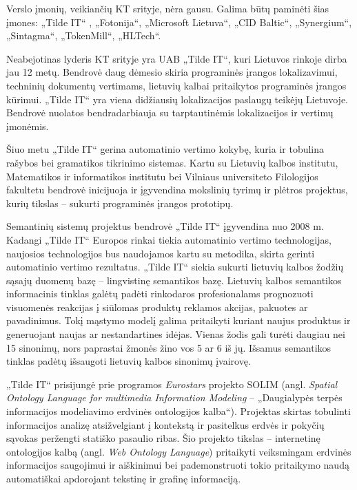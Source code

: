 \documentclass[]{../metanetpaper}
\begin{document}
\begin{multicols}{2}
Verslo įmonių, veikiančių KT srityje, nėra gausu. Galima būtų paminėti šias įmones: „Tilde IT“ , „Fotonija“, „Microsoft Lietuva“,  „CID Baltic“,  „Synergium“, „Sintagma“, „TokenMill“, „HLTech“.

    Neabejotinas lyderis KT srityje yra UAB „Tilde IT“, kuri Lietuvos rinkoje dirba jau 12 metų. Bendrovė daug dėmesio skiria programinės įrangos lokalizavimui, techninių dokumentų vertimams, lietuvių kalbai pritaikytos programinės įrangos kūrimui. „Tilde IT“ yra viena didžiausių lokalizacijos paslaugų teikėjų Lietuvoje. Bendrovė nuolatos bendradarbiauja su tarptautinėmis lokalizacijos ir vertimų įmonėmis.   

    Šiuo metu „Tilde IT“ gerina automatinio vertimo kokybę, kuria ir tobulina rašybos bei gramatikos tikrinimo sistemas. Kartu su Lietuvių kalbos institutu, Matematikos ir informatikos institutu bei Vilniaus universiteto Filologijos fakultetu bendrovė inicijuoja ir įgyvendina mokslinių tyrimų ir plėtros projektus, kurių tikslas – sukurti programinės įrangos prototipų.  

    Semantinių sistemų projektus bendrovė „Tilde IT“ įgyvendina nuo 2008 m. Kadangi „Tilde IT“ Europos rinkai tiekia automatinio vertimo technologijas, naujosios technologijos bus naudojamos kartu su metodika, skirta gerinti automatinio vertimo rezultatus. „Tilde IT“ siekia sukurti lietuvių kalbos žodžių sąsajų duomenų bazę – lingvistinę semantikos bazę. Lietuvių kalbos semantikos informacinis tinklas galėtų padėti rinkodaros profesionalams prognozuoti visuomenės reakcijas į siūlomas produktų reklamos akcijas, pakuotes ar pavadinimus. Tokį mąstymo modelį galima pritaikyti kuriant naujus produktus ir generuojant naujas ar nestandartines idėjas. Vienas žodis gali turėti daugiau nei 15 sinonimų, nors paprastai žmonės žino vos 5 ar 6 iš jų. Išsamus semantikos tinklas padėtų išsaugoti lietuvių kalbos sinonimų įvairovę.   

    „Tilde IT“ prisijungė prie programos \textit{Eurostars} projekto SOLIM (angl. \textit{Spatial Ontology Language for multimedia Information Modeling} – „Daugialypės terpės informacijos modeliavimo erdvinės ontologijos kalba“). Projektas skirtas tobulinti informacijos analizę atsižvelgiant į kontekstą ir pasitelkus erdvės ir pokyčių sąvokas peržengti statiško pasaulio ribas. Šio projekto tikslas – internetinę ontologijos kalbą (angl. \textit{Web Ontology Language}) pritaikyti veiksmingam erdvinės informacijos saugojimui ir aiškinimui bei pademonstruoti tokio pritaikymo naudą automatiškai apdorojant tekstinę ir grafinę informaciją.   


\end{multicols}
\end{document}
